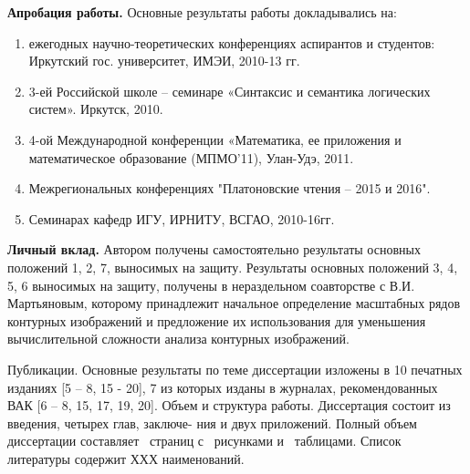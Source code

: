 \noindent
\textbf{Апробация работы.} Основные результаты работы докладывались на: 
\begin{enumerate}
\item ежегодных научно-теоретических конференциях аспирантов и студентов:  Иркутский  гос. университет, ИМЭИ, 2010-13 гг.
\item 3-ей Российской школе – семинаре «Синтаксис и семантика логических систем». Иркутск, 2010.
\item 4-ой Международной конференции «Математика, ее приложения и математическое   
    образование (МПМО’11),  Улан-Удэ, 2011.
\item Межрегиональных конференциях "Платоновские чтения – 2015 и 2016".
\item Семинарах кафедр ИГУ, ИРНИТУ, ВСГАО, 2010-16гг.
\end{enumerate}

\textbf{Личный вклад.} Автором получены самостоятельно результаты основных положений 1, 2, 7,  выносимых  на защиту.  Результаты основных положений 3, 4, 5, 6  выносимых  на защиту, получены в нераздельном соавторстве с В.И. Мартьяновым, которому принадлежит начальное определение масштабных рядов контурных изображений и предложение их использования для уменьшения вычислительной сложности анализа контурных изображений.

Публикации. Основные результаты по теме диссертации изложены в 10 печатных
изданиях [5 – 8, 15 - 20], 7 из которых изданы в журналах, рекомендованных ВАК [6 – 8, 15, 17, 19, 20].
Объем и структура работы. Диссертация состоит из введения, четырех глав, заключе-
ния и двух приложений. Полный объем диссертации составляет \pageref{LastPage}\ страниц с \totalfigures\ рисунками и \totaltables\ таблицами. Список литературы содержит ХХХ наименований.

%


